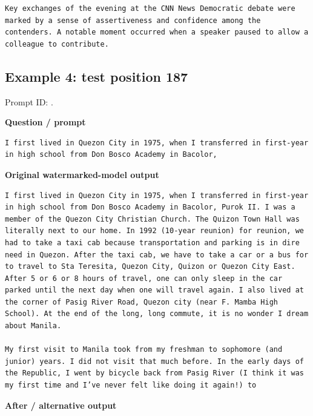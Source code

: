 \begin{Verbatim}
Key exchanges of the evening at the CNN News Democratic debate were marked by a sense of assertiveness and confidence among the contenders. A notable moment occurred when a speaker paused to allow a colleague to contribute.
\end{Verbatim}

\subsection{Example 4: test position
187}\label{record-docs-watermarking-qualitative-paper-kgw-bira-md-example-4-test-position-187}

Prompt ID:
\texttt{}.

\textbf{Question / prompt}

\begin{Verbatim}
I first lived in Quezon City in 1975, when I transferred in first-year in high school from Don Bosco Academy in Bacolor,
\end{Verbatim}

\textbf{Original watermarked-model output}

\begin{Verbatim}
I first lived in Quezon City in 1975, when I transferred in first-year in high school from Don Bosco Academy in Bacolor, Purok II. I was a member of the Quezon City Christian Church. The Quizon Town Hall was literally next to our home. In 1992 (10-year reunion) for reunion, we had to take a taxi cab because transportation and parking is in dire need in Quezon. After the taxi cab, we have to take a car or a bus for to travel to Sta Teresita, Quezon City, Quizon or Quezon City East. After 5 or 6 or 8 hours of travel, one can only sleep in the car parked until the next day when one will travel again. I also lived at the corner of Pasig River Road, Quezon city (near F. Mamba High School). At the end of the long, long commute, it is no wonder I dream about Manila.

My first visit to Manila took from my freshman to sophomore (and junior) years. I did not visit that much before. In the early days of the Republic, I went by bicycle back from Pasig River (I think it was my first time and I’ve never felt like doing it again!) to
\end{Verbatim}

\textbf{After / alternative output}

